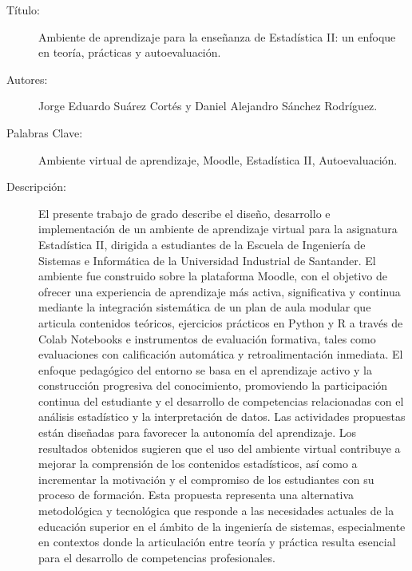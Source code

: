 \documentclass[letter,oneside,12pt,spanish]{report}
\begin{document}
\footnotesize{
\begin{description}
  \item[Título:] Ambiente de aprendizaje para la enseñanza de Estadística II: un enfoque en teoría, prácticas y autoevaluación.
  \item[Autores:] Jorge Eduardo Suárez Cortés y Daniel Alejandro Sánchez Rodríguez.
  \item[Palabras Clave:]Ambiente virtual de aprendizaje, Moodle, Estadística II, Autoevaluación.
  \item[Descripción:] El presente trabajo de grado describe el diseño, desarrollo e implementación de un ambiente de aprendizaje virtual para la asignatura Estadística II, dirigida a estudiantes de la Escuela de Ingeniería de Sistemas e Informática de la Universidad Industrial de Santander. El ambiente fue construido sobre la plataforma Moodle, con el objetivo de ofrecer una experiencia de aprendizaje más activa, significativa y continua mediante la integración sistemática de un plan de aula modular que articula contenidos teóricos, ejercicios prácticos en Python y R a través de Colab Notebooks e instrumentos de evaluación formativa, tales como evaluaciones con calificación automática y retroalimentación inmediata.
  El enfoque pedagógico del entorno se basa en el aprendizaje activo y la construcción progresiva del conocimiento, promoviendo la participación continua del estudiante y el desarrollo de competencias relacionadas con el análisis estadístico y la interpretación de datos. Las actividades propuestas están diseñadas para favorecer la autonomía del aprendizaje. Los resultados obtenidos sugieren que el uso del ambiente virtual contribuye a mejorar la comprensión de los contenidos estadísticos, así como a incrementar la motivación y el compromiso de los estudiantes con su proceso de formación. Esta propuesta representa una alternativa metodológica y tecnológica que responde a las necesidades actuales de la educación superior en el ámbito de la ingeniería de sistemas, especialmente en contextos donde la articulación entre teoría y práctica resulta esencial para el desarrollo de competencias profesionales.
  
  
\end{description}}\normalsize

\end{document}
